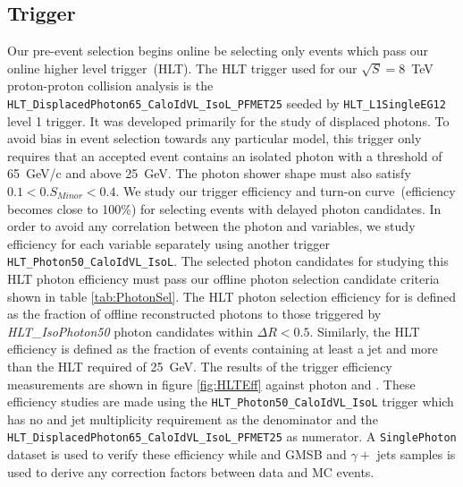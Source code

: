 \subsection{Trigger}
Our pre-event selection begins online be selecting only events which pass our online higher level trigger~(HLT). The HLT trigger used for our $\sqrt{S} = 8$~TeV proton-proton collision analysis is the \texttt{HLT\_DisplacedPhoton65\_CaloIdVL\_IsoL\_PFMET25} 
seeded by \texttt{HLT\_L1SingleEG12} level 1 trigger. It was developed primarily for the study of displaced photons. To avoid bias in event selection towards any particular model, this trigger only requires that an accepted event contains an isolated photon with a \pt threshold of 65~GeV/c and \MET above 25~GeV. The photon shower shape must also satisfy  $ 0.1 < 0.S_{Minor} < 0.4$. We study our trigger efficiency and turn-on curve~(efficiency becomes close to 100\%) for selecting  events with delayed photon candidates. In order to avoid any correlation between the photon and \MET variables, we study efficiency for each variable separately using another trigger \texttt{HLT\_Photon50\_CaloIdVL\_IsoL}.  The selected photon candidates for studying this HLT photon efficiency must pass our offline photon selection candidate criteria shown in table \ref{tab:PhotonSel}. The HLT photon selection efficiency for \pt is defined as the fraction of offline reconstructed photons to those triggered by \textit{HLT\_IsoPhoton50} photon candidates within $\Delta R < 0.5$.
Similarly, the \MET HLT efficiency is defined as the fraction of events containing at least a jet and \MET more than the HLT required \MET of 25~GeV.
The results of the trigger efficiency measurements are shown in figure \ref{fig:HLTEff} against photon \pt and \MET. These efficiency studies are made using the \texttt{HLT\_Photon50\_CaloIdVL\_IsoL} trigger which has no \MET and jet multiplicity requirement  as the denominator and the \texttt{HLT\_DisplacedPhoton65\_CaloIdVL\_IsoL\_PFMET25} as numerator. A \texttt{SinglePhoton} dataset is used to verify these efficiency while and GMSB and $\gamma +$ jets samples is used to derive any correction factors between data and MC events.
